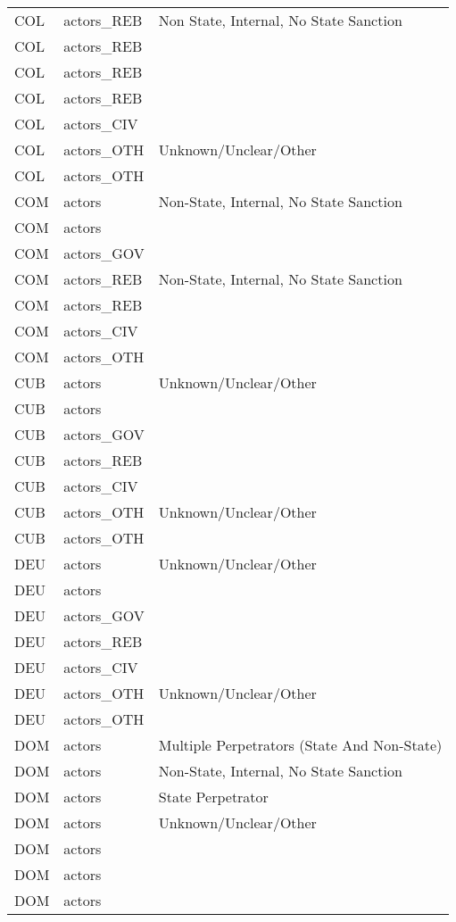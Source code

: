 \begin{table}[ht]
\begin{tabular}{lll}
  COL & actors\_REB & Non State, Internal, No State Sanction \\ 
  COL & actors\_REB &  \\ 
  COL & actors\_REB &  \\ 
  COL & actors\_REB &  \\ 
  COL & actors\_CIV &  \\ 
  COL & actors\_OTH & Unknown/Unclear/Other \\ 
  COL & actors\_OTH &  \\ 
  COM & actors & Non-State, Internal, No State Sanction \\ 
  COM & actors &  \\ 
  COM & actors\_GOV &  \\ 
  COM & actors\_REB & Non-State, Internal, No State Sanction \\ 
  COM & actors\_REB &  \\ 
  COM & actors\_CIV &  \\ 
  COM & actors\_OTH &  \\ 
  CUB & actors & Unknown/Unclear/Other \\ 
  CUB & actors &  \\ 
  CUB & actors\_GOV &  \\ 
  CUB & actors\_REB &  \\ 
  CUB & actors\_CIV &  \\ 
  CUB & actors\_OTH & Unknown/Unclear/Other \\ 
  CUB & actors\_OTH &  \\ 
  DEU & actors & Unknown/Unclear/Other \\ 
  DEU & actors &  \\ 
  DEU & actors\_GOV &  \\ 
  DEU & actors\_REB &  \\ 
  DEU & actors\_CIV &  \\ 
  DEU & actors\_OTH & Unknown/Unclear/Other \\ 
  DEU & actors\_OTH &  \\ 
  DOM & actors & Multiple Perpetrators (State And Non-State) \\ 
  DOM & actors & Non-State, Internal, No State Sanction \\ 
  DOM & actors & State Perpetrator \\ 
  DOM & actors & Unknown/Unclear/Other \\ 
  DOM & actors &  \\ 
  DOM & actors &  \\ 
  DOM & actors &  \\ 

\end{tabular}
\end{table}
